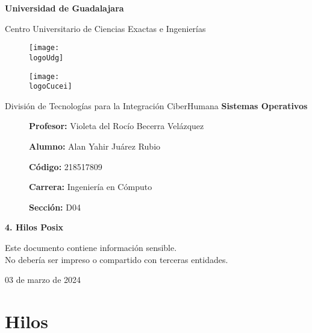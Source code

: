 \documentclass[12pt, a4paper]{article} %
\title{\theTitle}
\author{\theAuthor}
\newcommand{\logoUdg}{../../../../attachments/images/portada-udg.jpeg}
\newcommand{\logoCucei}{../../../../attachments/images/portada-cucei.jpeg}
\newcommand{\materia}{Sistemas Operativos}
\newcommand{\theTitle}{4. Hilos Posix}
\newcommand{\profesor}{Violeta del Rocío Becerra Velázquez}
\newcommand{\theAuthor}{Alan Yahir Juárez Rubio}
\newcommand{\code}{218517809}
\newcommand{\carrera}{Ingeniería en Cómputo}
\newcommand{\seccion}{D04}
\newcommand{\startDate}{03 de marzo de 2024}
\newcommand{\nl}{\par\vspace{0.4cm}}
\begin{document}
\cfoot{\ifodd\value{page}\else\thepage\fi} %

\begin{titlepage}
	\centering
	{\huge\textbf{Universidad de Guadalajara}}\par\vspace{0.6cm}
	{\LARGE{Centro Universitario de Ciencias Exactas e Ingenierías}}\vfill
	
	\begin{figure}[h]
		\begin{minipage}[t]{0.45\textwidth}
			\centering
			\texttt{[image: \\logoUdg]}
		\end{minipage}
		\hfill
		\begin{minipage}[t]{0.45\textwidth}
			\centering
			\texttt{[image: \\logoCucei]}
		\end{minipage}
	\end{figure}\vfill
	
	{\Large{División de Tecnologías para la Integración CiberHumana}}\vfill
	{\Large\textbf{\materia}}\vfill
	\begin{figure}[h]
		\centering
		\begin{minipage}[t]{0.75\textwidth}
			{\Large
				\textbf{Profesor:} \profesor\nl
				\textbf{Alumno:} \theAuthor\nl
				\textbf{Código:} \code\nl
				\textbf{Carrera:} \carrera\nl
				\textbf{Sección:} \seccion
			}
		\end{minipage}
	\end{figure}\vfill
	{\LARGE{\textbf{\theTitle}}}\vfill
	
	\begin{tcolorbox}[colback=red!5!white, colframe=red!75!black]
		\centering
		Este documento contiene información sensible.\\
		No debería ser impreso o compartido con terceras entidades.
	\end{tcolorbox}\vfill
	{\large \startDate}\par
\end{titlepage}

\clearpage
\tableofcontents

	

\clearpage
\section{Hilos}
\end{document}
